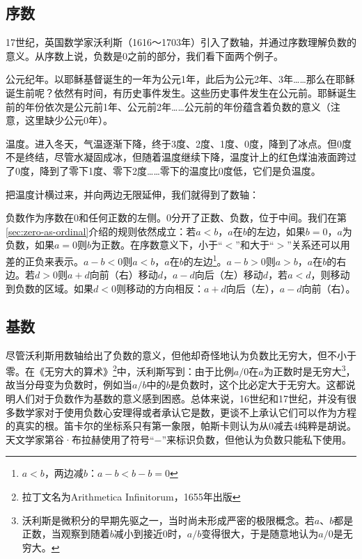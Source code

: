 \documentclass[b5paper]{ctexart}
\begin{document}
\subsection{序数}
  
17世纪，英国数学家沃利斯（1616～1703年）引入了数轴，并通过序数理解负数的意义。从序数上说，负数是0之前的部分，我们看下面两个例子。

\begin{example}
公元纪年。以耶稣基督诞生的一年为公元1年，此后为公元2年、3年……那么在耶稣诞生前呢？依然有时间，有历史事件发生。这些历史事件发生在公元前。耶稣诞生前的年份依次是公元前1年、公元前2年……公元前的年份蕴含着负数的意义（注意，这里缺少公元0年）。
\end{example}

\begin{example}
温度。进入冬天，气温逐渐下降，终于3度、2度、1度、0度，降到了冰点。但0度不是终结，尽管水凝固成冰，但随着温度继续下降，温度计上的红色煤油液面跨过了0度，降到了零下1度、零下2度……零下的温度比0度低，它们是负温度。
\end{example}

把温度计横过来，并向两边无限延伸，我们就得到了数轴：

\begin{center}
\end{center}

负数作为序数在0和任何正数的左侧。0分开了正数、负数，位于中间。我们在第\ref{sec:zero-as-ordinal}介绍的规则依然成立：若$a < b$，$a$在$b$的左边，如果$b = 0$，$a$为负数，如果$a = 0$则$b$为正数。在序数意义下，小于“$<$”和大于“$>$”关系还可以用差的正负来表示。$a - b < 0$则$a < b$，$a$在$b$的左边\footnote{$a < b$，两边减$b$：$a - b < b - b = 0$}。$a - b > 0$则$a > b$，$a$在$b$的右边。若$d > 0$则$a + d$向前（右）移动$d$，$a - d$向后（左）移动$d$，若$a < d$，则移动到负数的区域。如果$d < 0$则移动的方向相反：$a + d$向后（左），$a - d$向前（右）。

\subsection{基数}
尽管沃利斯用数轴给出了负数的意义，但他却奇怪地认为负数比无穷大，但不小于零。在《无穷大的算术》\footnote{拉丁文名为Arithmetica Infinitorum，1655年出版}中，沃利斯写到：由于比例$a/0$在$a$为正数时是无穷大\footnote{沃利斯是微积分的早期先驱之一，当时尚未形成严密的极限概念。若$a$、$b$都是正数，当观察到随着$b$减小到接近0时，$a/b$变得很大，于是随意地认为$a/0$是无穷大。}，故当分母变为负数时，例如当$a/b$中的$b$是负数时，这个比必定大于无穷大\cite{MKlein-1972}。这都说明人们对于负数作为基数的意义感到困惑。总体来说，16世纪和17世纪，并没有很多数学家对于使用负数心安理得或者承认它是数，更谈不上承认它们可以作为方程的真实的根\cite{MKlein-1972}。笛卡尔的坐标系只有第一象限，帕斯卡则认为从0减去4纯粹是胡说。天文学家第谷·布拉赫使用了符号“$-$”来标识负数，但他认为负数只能私下使用。
\end{document}
